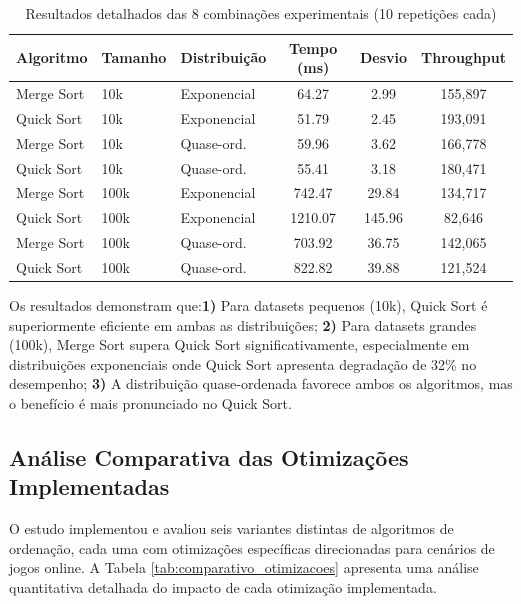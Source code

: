 \documentclass[conference]{IEEEtran}
\begin{document}
\begin{table}[H]
\centering
\caption{Resultados detalhados das 8 combinações experimentais (10 repetições cada)}
\label{tab:resultados_detalhados}
\scriptsize
\begin{tabular}{|l|l|l|c|c|c|}
\hline
\textbf{Algoritmo} & \textbf{Tamanho} & \textbf{Distribuição} & \textbf{Tempo (ms)} & \textbf{Desvio} & \textbf{Throughput} \\
\hline
Merge Sort & 10k & Exponencial & 64.27 & 2.99 & 155,897 \\
\hline
Quick Sort & 10k & Exponencial & 51.79 & 2.45 & 193,091 \\
\hline
Merge Sort & 10k & Quase-ord. & 59.96 & 3.62 & 166,778 \\
\hline
Quick Sort & 10k & Quase-ord. & 55.41 & 3.18 & 180,471 \\
\hline
Merge Sort & 100k & Exponencial & 742.47 & 29.84 & 134,717 \\
\hline
Quick Sort & 100k & Exponencial & 1210.07 & 145.96 & 82,646 \\
\hline
Merge Sort & 100k & Quase-ord. & 703.92 & 36.75 & 142,065 \\
\hline
Quick Sort & 100k & Quase-ord. & 822.82 & 39.88 & 121,524 \\
\hline
\end{tabular}
\end{table}

Os resultados demonstram que:\textbf{1)} Para datasets pequenos (10k), Quick Sort é superiormente eficiente em ambas as distribuições; \textbf{2)} Para datasets grandes (100k), Merge Sort supera Quick Sort significativamente, especialmente em distribuições exponenciais onde Quick Sort apresenta degradação de 32\% no desempenho; \textbf{3)} A distribuição quase-ordenada favorece ambos os algoritmos, mas o benefício é mais pronunciado no Quick Sort.

\subsection{Análise Comparativa das Otimizações Implementadas}

O estudo implementou e avaliou seis variantes distintas de algoritmos de ordenação, cada uma com otimizações específicas direcionadas para cenários de jogos online. A Tabela \ref{tab:comparativo_otimizacoes} apresenta uma análise quantitativa detalhada do impacto de cada otimização implementada.
\end{document}
